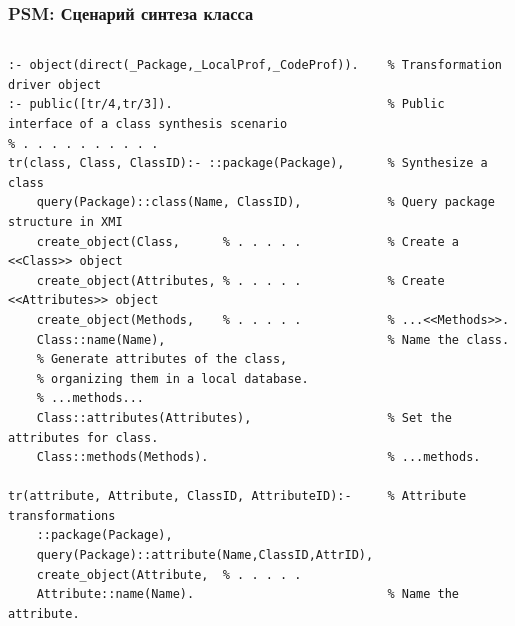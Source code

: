 \documentclass[10pt]{beamer}
\begin{document}
\begin{frame}[fragile] \frametitle{PSM: Сценарий синтеза класса}


  \begin{columns}
    \begin{column}{0.6\textwidth}
\begin{verbatim}
:- object(direct(_Package,_LocalProf,_CodeProf)).    % Transformation driver object
:- public([tr/4,tr/3]).                              % Public interface of a class synthesis scenario
% . . . . . . . . . .
tr(class, Class, ClassID):- ::package(Package),      % Synthesize a class
    query(Package)::class(Name, ClassID),            % Query package structure in XMI
    create_object(Class,      % . . . . .            % Create a <<Class>> object
    create_object(Attributes, % . . . . .            % Create <<Attributes>> object
    create_object(Methods,    % . . . . .            % ...<<Methods>>.
    Class::name(Name),                               % Name the class.
    % Generate attributes of the class,
    % organizing them in a local database.
    % ...methods...
    Class::attributes(Attributes),                   % Set the attributes for class.
    Class::methods(Methods).                         % ...methods.

tr(attribute, Attribute, ClassID, AttributeID):-     % Attribute transformations
    ::package(Package),
    query(Package)::attribute(Name,ClassID,AttrID),
    create_object(Attribute,  % . . . . .
    Attribute::name(Name).                           % Name the attribute.


\end{verbatim}
\end{column}
\end{columns}
\end{frame}
\end{document}
